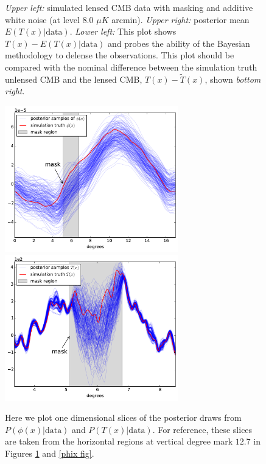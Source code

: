 \documentclass[iop,revtex4,apj,onecolumn]{emulateapj}
\begin{document}
\begin{figure}
\begin{center}
\end{center}
\caption{\label{tilde fig}
{\em Upper left:} simulated lensed CMB data with masking and additive white noise (at level $8.0$ $\mu K$ arcmin). {\em Upper right:} posterior mean $E(T(x)|\text{data})$. {\em Lower left:} This plot shows $T(x) - E(T(x)|\text{data})$ and probes the ability of the Bayesian methodology to delense the observations. This plot should be compared with the nominal difference between the simulation truth unlensed CMB and the lensed CMB,  $T(x) - \widetilde T(x)$, shown {\em bottom right}.
 }
\end{figure}



\begin{figure}
\begin{center}
{\includegraphics[height=2.5in]{figure7a.pdf}}%
{\includegraphics[height=2.5in]{figure7b.pdf}}
\end{center}
\caption{\label{slice fig} Here we plot one dimensional slices of the posterior draws from $P(\phi(x)|\text{data})$ and $P(T(x)|\text{data})$. For reference, these slices are taken from the horizontal regions at vertical degree mark $12.7$ in Figures \ref{tilde fig} and \ref{phix fig}.
}
\end{figure}
\end{document}
